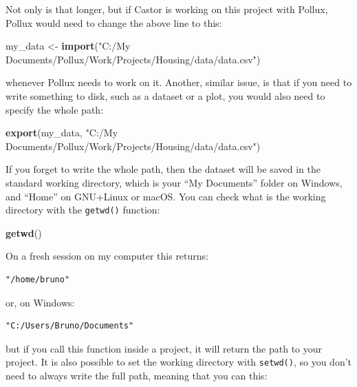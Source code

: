\documentclass[]{gitbook}
\newenvironment{Shaded}{\begin{snugshade}}{\end{snugshade}}
\newcommand{\KeywordTok}[1]{\textcolor[rgb]{0.13,0.29,0.53}{\textbf{#1}}}
\newcommand{\NormalTok}[1]{#1}
\newcommand{\StringTok}[1]{\textcolor[rgb]{0.31,0.60,0.02}{#1}}
\theoremstyle{definition}
\theoremstyle{definition}
\theoremstyle{definition}
\theoremstyle{remark}
\begin{document}
Not only is that longer, but if Castor is working on this project with
Pollux, Pollux would need to change the above line to this:

\begin{Shaded}
\begin{Highlighting}[]
\NormalTok{my_data <-}\StringTok{ }\KeywordTok{import}\NormalTok{(}\StringTok{"C:/My Documents/Pollux/Work/Projects/Housing/data/data.csv"}\NormalTok{)}
\end{Highlighting}
\end{Shaded}

whenever Pollux needs to work on it. Another, similar issue, is that if
you need to write something to disk, such as a dataset or a plot, you
would also need to specify the whole path:

\begin{Shaded}
\begin{Highlighting}[]
\KeywordTok{export}\NormalTok{(my_data, }\StringTok{"C:/My Documents/Pollux/Work/Projects/Housing/data/data.csv"}\NormalTok{)}
\end{Highlighting}
\end{Shaded}

If you forget to write the whole path, then the dataset will be saved in
the standard working directory, which is your ``My Documents'' folder on
Windows, and ``Home'' on GNU+Linux or macOS. You can check what is the
working directory with the \texttt{getwd()} function:

\begin{Shaded}
\begin{Highlighting}[]
\KeywordTok{getwd}\NormalTok{()}
\end{Highlighting}
\end{Shaded}

On a fresh session on my computer this returns:

\begin{verbatim}
"/home/bruno"
\end{verbatim}

or, on Windows:

\begin{verbatim}
"C:/Users/Bruno/Documents"
\end{verbatim}

but if you call this function inside a project, it will return the path
to your project. It is also possible to set the working directory with
\texttt{setwd()}, so you don't need to always write the full path,
meaning that you can this:
\end{document}

